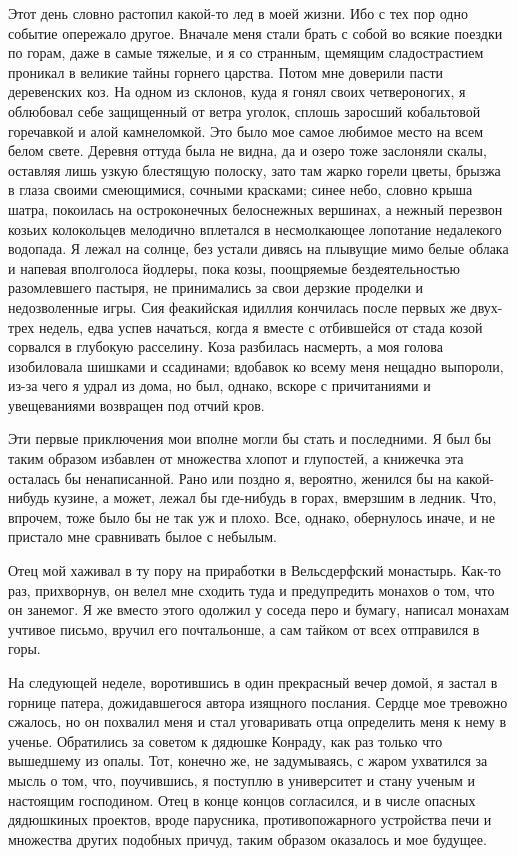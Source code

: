 Этот день  словно растопил какой-то  лед в моей  жизни. Ибо с  тех пор
одно событие  опережало другое.  Вначале меня стали  брать с  собой во
всякие  поездки по  горам,  даже в  самые тяжелые,  и  я со  странным,
щемящим сладострастием проникал в великие тайны горнего царства. Потом
мне  доверили пасти  деревенских  коз.  На одном  из  склонов, куда  я
гонял  своих  четвероногих,  я  облюбовал  себе  защищенный  от  ветра
уголок,  сплошь заросший  кобальтовой горечавкой  и алой  камнеломкой.
Это  было  мое  самое  любимое  место на  всем  белом  свете.  Деревня
оттуда  была не  видна,  да  и озеро  тоже  заслоняли скалы,  оставляя
лишь  узкую блестящую  полоску, зато  там жарко  горели цветы,  брызжа
в  глаза  своими  смеющимися,  сочными красками;  синее  небо,  словно
крыша  шатра,  покоилась  на  остроконечных  белоснежных  вершинах,  а
нежный перезвон козьих колокольцев  мелодично вплетался в несмолкающее
лопотание недалекого водопада. Я лежал на солнце, без устали дивясь на
плывущие мимо  белые облака и  напевая вполголоса йодлеры,  пока козы,
поощряемые  бездеятельностью разомлевшего  пастыря, не  принимались за
свои  дерзкие проделки  и недозволенные  игры. Сия  феакийская идиллия
кончилась после первых же двух-трех недель, едва успев начаться, когда
я вместе  с отбившейся от  стада козой сорвался в  глубокую расселину.
Коза разбилась насмерть, а моя голова изобиловала шишками и ссадинами;
вдобавок ко всему  меня нещадно выпороли, из-за чего я  удрал из дома,
но был,  однако, вскоре  с причитаниями  и увещеваниями  возвращен под
отчий кров.

Эти первые приключения  мои вполне могли бы стать и  последними. Я был
бы таким образом избавлен от  множества хлопот и глупостей, а книжечка
эта осталась бы ненаписанной. Рано  или поздно я, вероятно, женился бы
на какой-нибудь кузине, а может, лежал бы где-нибудь в горах, вмерзшим
в ледник. Что, впрочем,  тоже было бы не так уж  и плохо. Все, однако,
обернулось иначе, и не пристало мне сравнивать былое с небылым.

Отец мой  хаживал в ту  пору на приработки в  Вельсдерфский монастырь.
Как-то  раз, прихворнув,  он  велел мне  сходить  туда и  предупредить
монахов о том, что он занемог. Я же вместо этого одолжил у соседа перо
и бумагу,  написал монахам учтивое  письмо, вручил его  почтальонше, а
сам тайком от всех отправился в горы.

На  следующей неделе,  воротившись в  один прекрасный  вечер домой,  я
застал  в  горнице  патера, дожидавшегося  автора  изящного  послания.
Сердце мое  тревожно сжалось, но  он похвалил меня и  стал уговаривать
отца определить меня к нему в  ученье. Обратились за советом к дядюшке
Конраду, как  раз только что вышедшему  из опалы. Тот, конечно  же, не
задумываясь,  с жаром  ухватился за  мысль о  том, что,  поучившись, я
поступлю в университет  и стану ученым и настоящим  господином. Отец в
конце  концов  согласился,  и  в числе  опасных  дядюшкиных  проектов,
вроде парусника,  противопожарного устройства печи и  множества других
подобных причуд, таким образом оказалось и мое будущее.

